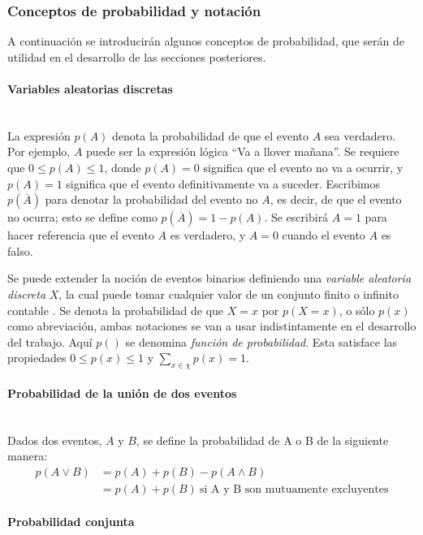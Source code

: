\subsubsection{Conceptos de probabilidad y notación}

	A continuación se introducirán algunos conceptos de probabilidad, que serán de utilidad en el desarrollo de las secciones posteriores.

	\paragraph*{Variables aleatorias discretas} ~\\

		La expresión $p(A)$ denota la probabilidad de que el evento $A$ sea verdadero. Por ejemplo, $A$ puede ser la expresión lógica ``Va a llover mañana''. Se requiere que $0 \leq p(A) \leq 1$, donde $p(A)=0$ significa que el evento no va a ocurrir, y $p(A)=1$ significa que el evento definitivamente va a suceder. Escribimos $p(\overline{A})$ para denotar la probabilidad del evento no $A$, es decir, de que el evento no ocurra; esto se define como $p(\overline{A})=1-p(A)$. Se escribirá $A=1$ para hacer referencia que el evento $A$ es verdadero, y $A=0$ cuando el evento $A$ es falso.
		
		Se puede extender la noción de eventos binarios definiendo una \textit{variable aleatoria discreta} $X$, la cual puede tomar cualquier valor de un conjunto finito o infinito contable \scalebox{1.4}{$\chi$}. Se denota la probabilidad de que $X=x$ por $p(X=x)$, o sólo $p(x)$ como abreviación, ambas notaciones se van a usar indistintamente en el desarrollo del trabajo. Aquí $p()$ se denomina \textit{función de probabilidad}. Esta satisface las propiedades $0 \leq p(x) \leq 1$ y $\sum_{x \in \chi}p(x)=1$.
		
	\paragraph*{Probabilidad de la unión de dos eventos} ~\\
		
		Dados dos eventos, $A$ y $B$, se define la probabilidad de A o B de la siguiente manera:
		\begin{align}
			p(A \lor B) &= p(A) + p(B) - p(A \land B) \\
			&= p(A) + p(B) ~\text{si A y B son mutuamente excluyentes}
		\end{align}
		
	\paragraph*{Probabilidad conjunta} ~\\
	
